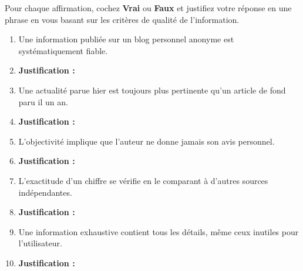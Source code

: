 \documentclass[11pt]{article}
\begin{document}
\begin{exercice}
Pour chaque affirmation, cochez \textbf{Vrai} ou \textbf{Faux} et justifiez votre réponse en une phrase en vous basant sur les critères de qualité de l'information.
\begin{enumerate}
    \item Une information publiée sur un blog personnel anonyme est systématiquement fiable.
    \item \textbf{Justification :} \dotfill
    \item Une actualité parue hier est toujours plus pertinente qu'un article de fond paru il un an.
    \item \textbf{Justification :} \dotfill
    \item L'objectivité implique que l'auteur ne donne jamais son avis personnel.
    \item \textbf{Justification :} \dotfill
    \item L'exactitude d'un chiffre se vérifie en le comparant à d'autres sources indépendantes.
    \item \textbf{Justification :} \dotfill
    \item Une information exhaustive contient tous les détails, même ceux inutiles pour l'utilisateur.
    \item \textbf{Justification :} \dotfill
\end{enumerate}
\end{exercice}
\end{document}
